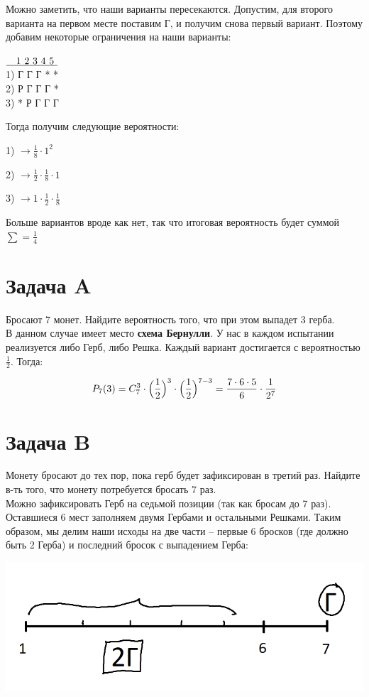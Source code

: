 \documentclass{article}
\begin{document}
Можно заметить, что наши варианты пересекаются. Допустим, для второго варианта на первом месте поставим Г, и получим снова первый вариант. Поэтому добавим некоторые ограничения на наши варианты:

\begin{center}
$\underline{\text{\quad1 2 3 4 5 }}$\\
1) Г Г Г * * \\
2) Р Г Г Г *\\
3) * Р Г Г Г
\end{center}

Тогда получим следующие вероятности:

1) $\rightarrow \frac{1}{8} \cdot 1^2 $

2) $\rightarrow \frac{1}{2} \cdot \frac{1}{8} \cdot 1$

3) $\rightarrow 1 \cdot \frac{1}{2} \cdot \frac{1}{8} $

Больше вариантов вроде как нет, так что итоговая вероятность будет суммой $\sum = \frac{1}{4}$

\section{Задача A}
Бросают 7 монет. Найдите вероятность того, что при этом выпадет 3 герба.
\\

В данном случае имеет место \textbf{схема Бернулли}. У нас в каждом испытании реализуется либо Герб, либо Решка. Каждый вариант достигается с вероятностью $\frac{1}{2}$. Тогда:

$$P_7(3) = C_7^3 \cdot \Bigl(\frac{1}{2}\Bigr)^3 \cdot \Bigl(\frac{1}{2}\Bigr)^{7 - 3}
= \frac{7 \cdot 6 \cdot 5}{6} \cdot \frac{1}{2^7}$$

\section{Задача B}
Монету бросают до тех пор, пока герб будет зафиксирован в третий раз. Найдите в-ть того, что монету потребуется бросать 7 раз.
\\

Можно зафиксировать Герб на седьмой позиции (так как бросам до 7 раз). Оставшиеся 6 мест заполняем двумя Гербами и остальными Решками. Таким образом, мы делим наши исходы на две части -- первые 6 бросков (где должно быть 2 Герба) и последний бросок с выпадением Герба:

\begin{center}
    \includegraphics[scale=0.35]{1.png}
\end{center}
\end{document}
